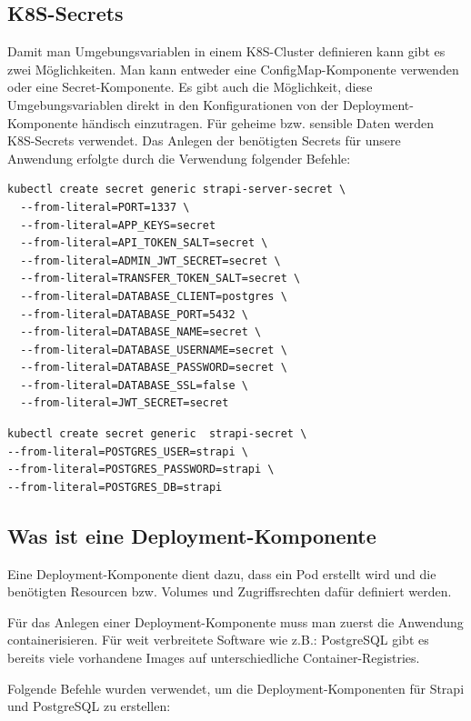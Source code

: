 \subsection{K8S-Secrets}
Damit man Umgebungsvariablen in einem K8S-Cluster definieren kann gibt es zwei Möglichkeiten.
Man kann entweder eine ConfigMap-Komponente verwenden oder eine Secret-Komponente. Es gibt auch die Möglichkeit, diese Umgebungsvariablen direkt in den Konfigurationen von der Deployment-Komponente händisch einzutragen.
Für geheime bzw. sensible Daten werden K8S-Secrets verwendet.
Das Anlegen der benötigten Secrets für unsere Anwendung erfolgte durch die Verwendung folgender Befehle:
\begin{lstlisting}[caption=Secrets für Strapi]
    kubectl create secret generic strapi-server-secret \
  --from-literal=PORT=1337 \  
  --from-literal=APP_KEYS=secret
  --from-literal=API_TOKEN_SALT=secret \
  --from-literal=ADMIN_JWT_SECRET=secret \
  --from-literal=TRANSFER_TOKEN_SALT=secret \
  --from-literal=DATABASE_CLIENT=postgres \
  --from-literal=DATABASE_PORT=5432 \
  --from-literal=DATABASE_NAME=secret \
  --from-literal=DATABASE_USERNAME=secret \
  --from-literal=DATABASE_PASSWORD=secret \
  --from-literal=DATABASE_SSL=false \
  --from-literal=JWT_SECRET=secret
\end{lstlisting}


\begin{lstlisting}[caption=Secrets für die Datenbank]
kubectl create secret generic  strapi-secret \
--from-literal=POSTGRES_USER=strapi \
--from-literal=POSTGRES_PASSWORD=strapi \
--from-literal=POSTGRES_DB=strapi
\end{lstlisting}








\subsection{Was ist eine Deployment-Komponente}

Eine Deployment-Komponente dient dazu, dass ein Pod erstellt wird und die benötigten Resourcen bzw. Volumes und Zugriffsrechten
dafür definiert werden.\cite{k8s-deployment}

Für das Anlegen einer Deployment-Komponente muss man zuerst die Anwendung containerisieren.
Für weit verbreitete Software wie z.B.: PostgreSQL gibt es bereits viele vorhandene Images auf unterschiedliche Container-Registries.

Folgende Befehle wurden verwendet, um die Deployment-Komponenten für Strapi und PostgreSQL zu erstellen:

